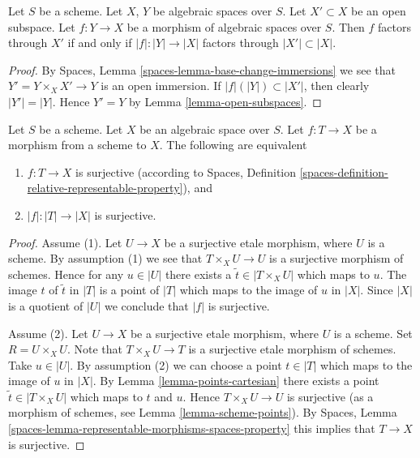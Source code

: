 \begin{lemma}
\label{lemma-factor-through-open-subspace}
Let $S$ be a scheme.
Let $X$, $Y$ be algebraic spaces over $S$.
Let $X' \subset X$ be an open subspace.
Let $f : Y \to X$ be a morphism of algebraic spaces over $S$.
Then $f$ factors through $X'$ if and only if $|f| : |Y| \to |X|$
factors through $|X'| \subset |X|$.
\end{lemma}

\begin{proof}
By Spaces, Lemma \ref{spaces-lemma-base-change-immersions}
we see that $Y' = Y \times_X X' \to Y$ is an open immersion.
If $|f|(|Y|) \subset |X'|$, then clearly $|Y'| = |Y|$. Hence $Y' = Y$ by
Lemma \ref{lemma-open-subspaces}.
\end{proof}

\begin{lemma}
\label{lemma-characterize-surjective}
Let $S$ be a scheme.
Let $X$ be an algebraic space over $S$.
Let $f : T \to X$ be a morphism from a scheme to $X$.
The following are equivalent
\begin{enumerate}
\item $f : T \to X$ is surjective (according to
Spaces, Definition \ref{spaces-definition-relative-representable-property}),
and
\item $|f| : |T| \to |X|$ is surjective.
\end{enumerate}
\end{lemma}

\begin{proof}
Assume (1). Let $U \to X$ be a surjective etale morphism, where $U$ is
a scheme. By assumption (1) we see that $T \times_X U \to U$ is a surjective
morphism of schemes. Hence for any $u \in |U|$ there exists a 
$\tilde t \in |T \times_X U|$ which maps to $u$. The image $t$ of $\tilde t$
in $|T|$ is a point of $|T|$ which maps to the image of $u$ in $|X|$.
Since $|X|$ is a quotient of $|U|$ we conclude that $|f|$ is surjective.

\medskip\noindent
Assume (2). Let $U \to X$ be a surjective etale morphism, where $U$ is
a scheme. Set $R = U \times_X U$. Note that $T \times_X U \to T$ is a
surjective etale morphism of schemes. Take $u \in |U|$. By assumption (2)
we can choose a point $t \in |T|$ which maps to the image of $u$ in $|X|$.
By Lemma \ref{lemma-points-cartesian} there exists a point
$\tilde t \in |T \times_X U|$ which maps to $t$ and $u$.
Hence $T \times_X U \to U$ is surjective (as a morphism of schemes,
see Lemma \ref{lemma-scheme-points}). By
Spaces, Lemma \ref{spaces-lemma-representable-morphisms-spaces-property}
this implies that $T \to X$ is surjective.
\end{proof}

